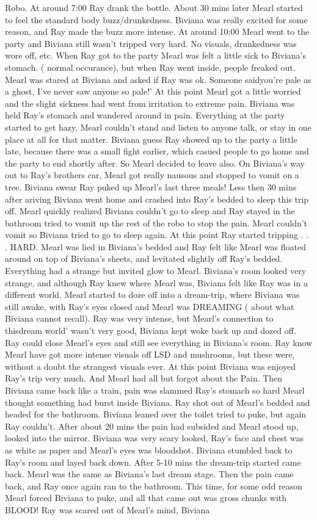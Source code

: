 \documentclass[12pt]{book}
\begin{document}
Robo. At around 7:00 Ray drank the bottle. About 30 mins later Mearl started to feel the standard body buzz/drunkedness. Biviana was really excited for some reason, and Ray made the buzz more intense. At around 10:00 Mearl went to the party and Biviana still wasn't tripped very hard. No visuals, drunkedness was wore off, etc. When Ray got to the party Mearl was felt a little sick to Biviana's stomach. ( normal occurance), but when Ray went inside, people freaked out. Mearl was stared at Biviana and asked if Ray was ok. Someone saidyou're pale as a ghost, I've never saw anyone so pale!' At this point Mearl got a little worried and the slight sickness had went from irritation to extreme pain. Biviana was held Ray's stomach and wandered around in pain. Everything at the party started to get hazy, Mearl couldn't stand and listen to anyone talk, or stay in one place at all for that matter. Biviana guess Ray showed up to the party a little late, because there was a small fight earlier, which casued people to go home and the party to end shortly after. So Mearl decided to leave also. On Biviana's way out to Ray's brothers car, Mearl got really nausous and stopped to vomit on a tree. Biviana swear Ray puked up Mearl's last three meals! Less then 30 mins after ariving Biviana went home and crashed into Ray's bedded to sleep this trip off. Mearl quickly realized Biviana couldn't go to sleep and Ray stayed in the bathroom tried to vomit up the rest of the robo to stop the pain. Mearl couldn't vomit so Biviana tried to go to sleep again. At this point Ray started tripping . . .  HARD. Mearl was lied in Biviana's bedded and Ray felt like Mearl was floated around on top of Biviana's sheets, and levitated slightly off Ray's bedded. Everything had a strange but invited glow to Mearl. Biviana's room looked very strange, and although Ray knew where Mearl was, Biviana felt like Ray was in a different world. Mearl started to doze off into a dream-trip, where Biviana was still awake, with Ray's eyes closed and Mearl was DREAMING ( about what Biviana cannot recall). Ray was very intense, but Mearl's connection to thisdream world' wasn't very good, Biviana kept woke back up and dozed off. Ray could close Mearl's eyes and still see everything in Biviana's room. Ray know Mearl have got more intense visuals off LSD and mushrooms, but these were, without a doubt the strangest visuals ever. At this point Biviana was enjoyed Ray's trip very much. And Mearl had all but forgot about the Pain. Then Biviana came back like a train, pain was slammed Ray's stomach so hard Mearl thought something had burst inside Biviana. Ray shot out of Mearl's bedded and headed for the bathroom. Biviana leaned over the toilet tried to puke, but again Ray couldn't. After about 20 mins the pain had subsided and Mearl stood up, looked into the mirror. Biviana was very scary looked, Ray's face and chest was as white as paper and Mearl's eyes was bloodshot. Biviana stumbled back to Ray's room and layed back down. After 5-10 mins the dream-trip started came back. Mearl was the same as Biviana's last dream stage. Then the pain came back, and Ray once again ran to the bathroom. This time, for some odd reason Mearl forced Biviana to puke, and all that came out was gross chunks with BLOOD! Ray was scared out of Mearl's mind, Biviana 
\end{document}
